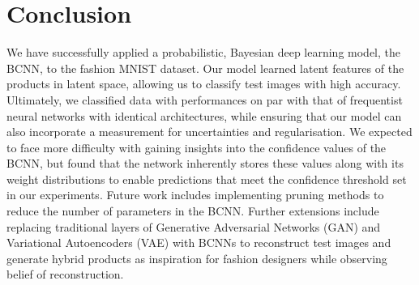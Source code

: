 \newpage

\section{Conclusion}

We have successfully applied a probabilistic, Bayesian deep learning model, the BCNN, to the fashion MNIST dataset. Our model learned latent features of the products in latent space, allowing us to classify test images with high accuracy. Ultimately, we classified data with performances on par with that of frequentist neural networks with identical architectures, while ensuring that our model can also incorporate a measurement for uncertainties and regularisation. We expected to face more difficulty with gaining insights into the confidence values of the BCNN, but found that the network inherently stores these values along with its weight distributions to enable predictions that meet the confidence threshold set in our experiments. Future work includes implementing pruning methods to reduce the number of parameters in the BCNN. Further extensions include replacing traditional layers of Generative Adversarial Networks (GAN) and Variational Autoencoders (VAE) with BCNNs to reconstruct test images and generate hybrid products as inspiration for fashion designers while observing belief of reconstruction.
